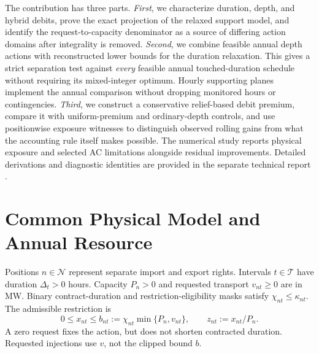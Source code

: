 \documentclass[10pt,journal]{IEEEtran}
\begin{document}
The contribution has three parts. \emph{First}, we characterize duration, depth, and hybrid debits, prove the exact projection of the relaxed support model, and identify the request-to-capacity denominator as a source of differing action domains after integrality is removed. \emph{Second}, we combine feasible annual depth actions with reconstructed lower bounds for the duration relaxation. This gives a strict separation test against \emph{every} feasible annual touched-duration schedule without requiring its mixed-integer optimum. Hourly supporting planes implement the annual comparison without dropping monitored hours or contingencies. \emph{Third}, we construct a conservative relief-based debit premium, compare it with uniform-premium and ordinary-depth controls, and use positionwise exposure witnesses to distinguish observed rolling gains from what the accounting rule itself makes possible. The numerical study reports physical exposure and selected AC limitations alongside residual improvements. Detailed derivations and diagnostic identities are provided in the separate technical report \cite{Kryeziu2026Technical}.

\section{Common Physical Model and Annual Resource}
\label{sec:model}
Positions $n\in\mathcal N$ represent separate import and export rights. Intervals $t\in\mathcal T$ have duration $\Delta_t>0$ hours. Capacity $P_n>0$ and requested transport $v_{nt}\geq0$ are in MW. Binary contract-duration and restriction-eligibility masks satisfy $\chi_{nt}\leq\kappa_{nt}$. The admissible restriction is
\begin{equation}
0\leq x_{nt}\leq b_{nt}:=\chi_{nt}\min\{P_n,v_{nt}\},
\qquad z_{nt}:=x_{nt}/P_n.
\label{eq:box}
\end{equation}
A zero request fixes the action, but does not shorten contracted duration. Requested injections use $v$, not the clipped bound $b$.
\end{document}

